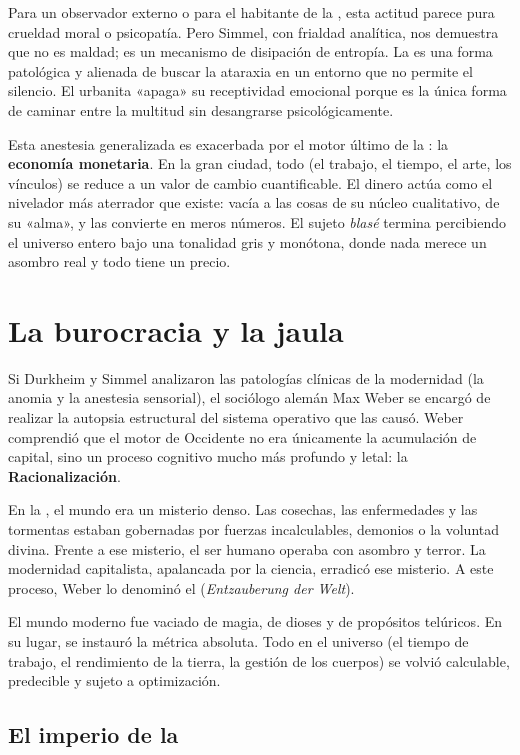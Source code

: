 Para un observador externo o para el habitante de la \Gemeinschaft, esta actitud parece pura crueldad moral o psicopatía. Pero Simmel, con frialdad analítica, nos demuestra que no es maldad; es un mecanismo de disipación de entropía. La \ActitudBlase{} es una forma patológica y alienada de buscar la ataraxia en un entorno que no permite el silencio. El urbanita «apaga» su receptividad emocional porque es la única forma de caminar entre la multitud sin desangrarse psicológicamente.

Esta anestesia generalizada es exacerbada por el motor último de la \Gesellschaft: la \textbf{economía monetaria}. En la gran ciudad, todo (el trabajo, el tiempo, el arte, los vínculos) se reduce a un valor de cambio cuantificable. El dinero actúa como el nivelador más aterrador que existe: vacía a las cosas de su núcleo cualitativo, de su «alma», y las convierte en meros números. El sujeto \textit{blasé} termina percibiendo el universo entero bajo una tonalidad gris y monótona, donde nada merece un asombro real y todo tiene un precio.
\section{La burocracia y la jaula}

Si Durkheim y Simmel analizaron las patologías clínicas de la modernidad (la anomia y la anestesia sensorial), el sociólogo alemán Max Weber se encargó de realizar la autopsia estructural del sistema operativo que las causó. Weber comprendió que el motor de Occidente no era únicamente la acumulación de capital, sino un proceso cognitivo mucho más profundo y letal: la \textbf{Racionalización}.

En la \Gemeinschaft{}, el mundo era un misterio denso. Las cosechas, las enfermedades y las tormentas estaban gobernadas por fuerzas incalculables, demonios o la voluntad divina. Frente a ese misterio, el ser humano operaba con asombro y terror. La modernidad capitalista, apalancada por la ciencia, erradicó ese misterio. A este proceso, Weber lo denominó el \textbf{\Desencantamiento} (\textit{Entzauberung der Welt}). 

El mundo moderno fue vaciado de magia, de dioses y de propósitos telúricos. En su lugar, se instauró la métrica absoluta. Todo en el universo (el tiempo de trabajo, el rendimiento de la tierra, la gestión de los cuerpos) se volvió calculable, predecible y sujeto a optimización.

\subsection{El imperio de la \RacionalidadInstrumental}

